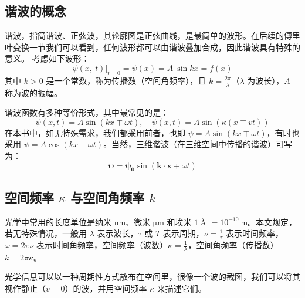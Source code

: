 \documentclass[UTF8]{report}
\theoremstyle{MyLineTheoremStyle} %
\theoremstyle{MyBlockTheoremStyle} %
\theoremstyle{MySubsubsectionStyle} %
\begin{document}
\subsection{谐波的概念} 
谐波，指简谐波、正弦波，其轮廓图是正弦曲线，是最简单的波形。在后续的傅里叶变换一节我们可以看到，任何波形都可以由谐波叠加合成，因此谐波具有特殊的意义。
考虑如下波形：
\begin{equation}
    \psi(x,\:t)\big|_{t=0}=\psi(x)=A\:\sin kx=f(x)
\end{equation}
其中 $k>0$ 是一个常数，称为传播数（空间角频率），且 $k = \frac{2\pi}{\lambda} $（$\lambda$ 为波长），$A$ 称为波的振幅。\par

谐波函数有多种等价形式，其中最常见的是：
\begin{equation}
    \psi(x,t)=A\sin(kx\mp\omega t) ,\quad \psi(x,t)=A\sin \left(  \kappa (x\mp vt) \right)
\end{equation}
在本书中，如无特殊需求，我们都采用前者，也即 $\psi = A\sin(kx\mp\omega t)$，有时也采用 $\psi = A\cos(kx\mp\omega t)$。当然，三维谐波（在三维空间中传播的谐波）可写为：
\begin{equation}
    \boldsymbol{\psi}=\boldsymbol{\psi_0}\sin(\boldsymbol{k}\cdot \boldsymbol{x} \mp \omega t)
\end{equation}

\subsection{空间频率 $\kappa$ 与空间角频率 $k$}

光学中常用的长度单位是纳米 $\mathrm{nm}$、微米 $\mathrm{\mu m}$ 和埃米 $1\ \si{\angstrom}$ $ = 10^{-10}\ \mathrm{m}$。本文规定，若无特殊情况，一般用 $\lambda$ 表示波长，$\tau $ 或 $T$ 表示周期，$\nu = \frac{1}{\tau}$ 表示时间频率，$\omega = 2\pi\nu$ 表示时间角频率，空间频率（波数）$\kappa = \frac{1}{\lambda}$，空间角频率（传播数）$k = 2\pi \kappa$。

光学信息可以以一种周期性方式散布在空间里，很像一个波的截图，我们可以将其视作静止（$v=0$）的波，并用空间频率 $\kappa$ 来描述它们。
\end{document}
